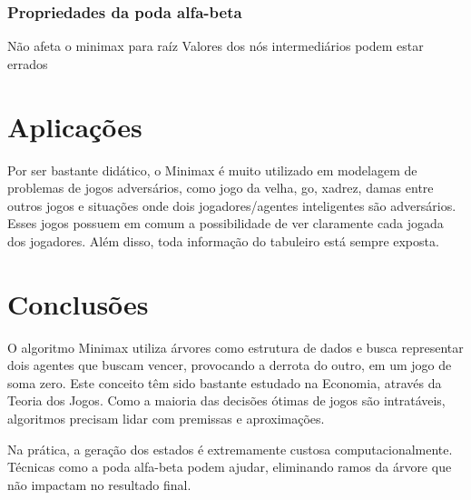 \documentclass[sigplan,screen]{acmart}
\begin{document}
\subsubsection{Propriedades da poda alfa-beta}
Não afeta o minimax para raíz
Valores dos nós intermediários podem estar errados

\section{Aplicações}
Por ser bastante didático, o Minimax é muito utilizado em modelagem de problemas de jogos adversários, como jogo da velha, go, xadrez, damas entre outros jogos e situações onde dois jogadores/agentes inteligentes são adversários.
Esses jogos possuem em comum a possibilidade de ver claramente cada jogada dos jogadores. Além disso, toda informação do tabuleiro está sempre exposta.

\section{Conclusões}
O algoritmo Minimax utiliza árvores como estrutura de dados e busca representar dois agentes que buscam vencer, provocando a derrota do outro, em um jogo de soma zero. 
Este conceito têm sido bastante estudado na Economia, através da Teoria dos Jogos. 
Como a maioria das decisões ótimas de jogos são intratáveis, algoritmos precisam lidar com premissas e aproximações.

Na prática, a geração dos estados é extremamente custosa computacionalmente. Técnicas como a poda alfa-beta podem ajudar, eliminando ramos da árvore que não impactam no resultado final.



\end{document}
